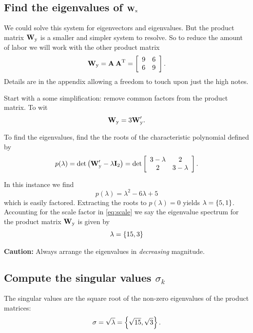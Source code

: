 \subsection{Find the eigenvalues of $\W{x}$}
We could solve this system for eigenvectors and eigenvalues. But the product matrix $\W{y}$ is a smaller and simpler system to resolve. So to reduce the amount of labor we will work with the other product matrix
\begin{equation}
  \W{y}=\A{}\,\A{T} =
\left[
\begin{array}{cc}
 9 & 6 \\
 6 & 9
\end{array}
\right].
\label{eq:problemgen:Wy}
\end{equation}
Details are in the appendix allowing a freedom to touch upon just the high notes. 

Start with a some simplification: remove common factors from the product matrix. To wit
\begin{equation}
  \W{y}=3\W{y}'.
  \label{eq:scale}
\end{equation}

To find the eigenvalues, find the the roots of the  characteristic polynomial defined by
\begin{equation}
  p(\lambda) = \det \paren{\W{y}'-\lambda \I{2}} =
  \det \mat{cc}
  {
  3-\lambda & 2 \\
  2 & 3-\lambda
  }.
\end{equation}

In this instance we find
\begin{equation}
  p(\lambda) = \lambda^{2} - 6\lambda + 5
\end{equation}
which is easily factored. Extracting the roots to $p(\lambda) = 0$ yields $\lambda = \lst{5,1}$. Accounting for the scale factor in \eqref{eq:scale} we say the eigenvalue spectrum for the product matrix $\W{y}$ is given by
\begin{equation}
  \lambda = \lst{15, 3}
\end{equation}

\textbf{Caution:} Always arrange the eigenvalues in \textit{decreasing} magnitude.

\subsection{Compute the singular values $\sigma_{k}$}
The singular values are the square root of the non-zero eigenvalues of the product matrices:
\begin{equation}
  \sigma = \sqrt{\lambda} = \lst{\sqrt{15},\sqrt{3}}.
\end{equation}

